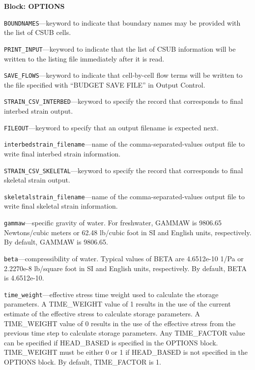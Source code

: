 
\item \textbf{Block: OPTIONS}

\begin{description}
\item \texttt{BOUNDNAMES}---keyword to indicate that boundary names may be provided with the list of CSUB cells.

\item \texttt{PRINT\_INPUT}---keyword to indicate that the list of CSUB information will be written to the listing file immediately after it is read.

\item \texttt{SAVE\_FLOWS}---keyword to indicate that cell-by-cell flow terms will be written to the file specified with ``BUDGET SAVE FILE'' in Output Control.

\item \texttt{STRAIN\_CSV\_INTERBED}---keyword to specify the record that corresponds to final interbed strain output.

\item \texttt{FILEOUT}---keyword to specify that an output filename is expected next.

\item \texttt{interbedstrain\_filename}---name of the comma-separated-values output file to write final interbed strain information.

\item \texttt{STRAIN\_CSV\_SKELETAL}---keyword to specify the record that corresponds to final skeletal strain output.

\item \texttt{skeletalstrain\_filename}---name of the comma-separated-values output file to write final skeletal strain information.

\item \texttt{gammaw}---specific gravity of water. For freshwater, GAMMAW is 9806.65 Newtons/cubic meters or 62.48 lb/cubic foot in SI and English units, respectively. By default, GAMMAW is 9806.65.

\item \texttt{beta}---compressibility of water. Typical values of BETA are 4.6512e-10 1/Pa or 2.2270e-8 lb/square foot in SI and English units, respectively. By default, BETA is 4.6512e-10.

\item \texttt{time\_weight}---effective stress time weight used to calculate the storage parameters. A TIME\_WEIGHT value of 1 results in the use of the current estimate of the effective stress to calculate storage parameters. A TIME\_WEIGHT value of 0 results in the use of the effective stress from the previous time step to calculate storage parameters. Any TIME\_FACTOR value can be specified if HEAD\_BASED is specified in the OPTIONS block.  TIME\_WEIGHT must be either 0 or 1 if HEAD\_BASED is not specified in the OPTIONS block. By default, TIME\_FACTOR is 1.


\end{description}
